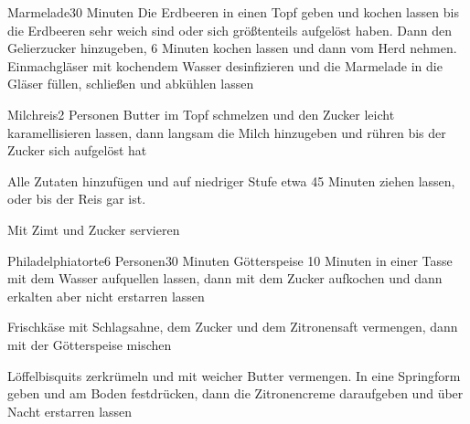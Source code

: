 
\begin{recipe}{Marmelade}{}{30 Minuten}
Die Erdbeeren in einen Topf geben und kochen lassen bis die Erdbeeren sehr weich sind oder sich größtenteils aufgelöst haben. Dann den Gelierzucker hinzugeben, 6 Minuten kochen lassen und dann vom Herd nehmen. Einmachgläser mit kochendem Wasser desinfizieren und die Marmelade in die Gläser füllen, schließen und abkühlen lassen
\end{recipe}


\begin{recipe}{Milchreis}{2 Personen}{}
Butter im Topf schmelzen und den Zucker leicht karamellisieren lassen, dann langsam die Milch hinzugeben und rühren bis der Zucker sich aufgelöst hat

Alle Zutaten hinzufügen und auf niedriger Stufe etwa 45 Minuten ziehen lassen, oder bis der Reis gar ist.

Mit Zimt und Zucker servieren
\end{recipe}


\begin{recipe}{Philadelphiatorte}{6 Personen}{30 Minuten}
Götterspeise 10 Minuten in einer Tasse mit dem Wasser aufquellen lassen, dann mit dem Zucker aufkochen und dann erkalten aber nicht erstarren lassen

Frischkäse mit Schlagsahne, dem Zucker und dem Zitronensaft vermengen, dann mit der Götterspeise mischen

Löffelbisquits zerkrümeln und mit weicher Butter vermengen.
In eine Springform geben und am Boden festdrücken, dann die Zitronencreme daraufgeben und über Nacht erstarren lassen
\end{recipe}

